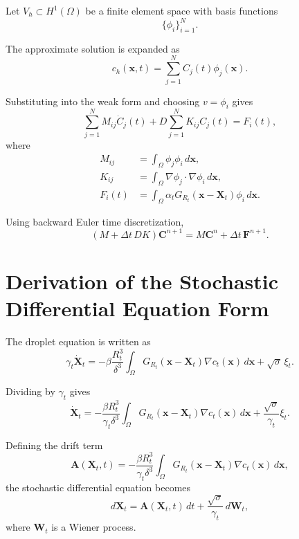 Let \(V_h \subset H^1(\Omega)\) be a finite element space with basis functions
\begin{equation}
\{\phi_i\}_{i=1}^{N}.
\end{equation}

The approximate solution is expanded as
\begin{equation}
c_h(\mathbf{x},t)
=
\sum_{j=1}^{N}
C_j(t)\phi_j(\mathbf{x}).
\end{equation}

Substituting into the weak form and choosing \(v=\phi_i\) gives
\begin{equation}
\sum_{j=1}^{N}
M_{ij}\dot{C}_j(t)
+
D\sum_{j=1}^{N}
K_{ij}C_j(t)
=
F_i(t),
\end{equation}
where
\begin{align}
M_{ij}
&=
\int_{\Omega}
\phi_j\phi_i\,d\mathbf{x},
\\
K_{ij}
&=
\int_{\Omega}
\nabla\phi_j\cdot\nabla\phi_i\,d\mathbf{x},
\\
F_i(t)
&=
\int_{\Omega}
\alpha_t
G_{R_t}(\mathbf{x}-\mathbf{X}_t)
\phi_i\,d\mathbf{x}.
\end{align}

Using backward Euler time discretization,
\begin{equation}
\left(M+\Delta t\,DK\right)\mathbf{C}^{n+1}
=
M\mathbf{C}^{n}
+
\Delta t\,\mathbf{F}^{n+1}.
\end{equation}

\section{Derivation of the Stochastic Differential Equation Form}

The droplet equation is written as
\begin{equation}
\gamma_t \dot{\mathbf{X}}_t
=
-\beta \frac{R_t^3}{\delta^3}
\int_{\Omega}
G_{R_t}(\mathbf{x}-\mathbf{X}_t)
\nabla c_t(\mathbf{x})\,d\mathbf{x}
+
\sqrt{\sigma}\,\xi_t.
\end{equation}

Dividing by \(\gamma_t\) gives
\begin{equation}
\dot{\mathbf{X}}_t
=
-\frac{\beta R_t^3}{\gamma_t\delta^3}
\int_{\Omega}
G_{R_t}(\mathbf{x}-\mathbf{X}_t)
\nabla c_t(\mathbf{x})\,d\mathbf{x}
+
\frac{\sqrt{\sigma}}{\gamma_t}\xi_t.
\end{equation}

Defining the drift term
\begin{equation}
\mathbf{A}(\mathbf{X}_t,t)
=
-\frac{\beta R_t^3}{\gamma_t\delta^3}
\int_{\Omega}
G_{R_t}(\mathbf{x}-\mathbf{X}_t)
\nabla c_t(\mathbf{x})\,d\mathbf{x},
\end{equation}
the stochastic differential equation becomes
\begin{equation}
d\mathbf{X}_t
=
\mathbf{A}(\mathbf{X}_t,t)\,dt
+
\frac{\sqrt{\sigma}}{\gamma_t}\,d\mathbf{W}_t,
\end{equation}
where \(\mathbf{W}_t\) is a Wiener process.

